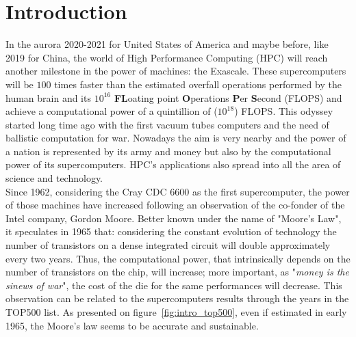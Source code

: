 \chapter*{Introduction}

In the aurora 2020-2021 for United States of America and maybe before, like 2019 for China, the world of High Performance Computing (HPC) will reach another milestone in the power of machines: the Exascale. 
These supercomputers will be $100$ times faster than the estimated overfall operations performed by the human brain and its $10^{16}$ \textbf{FL}oating point \textbf{O}perations \textbf{P}er \textbf{S}econd (FLOPS) and achieve a computational power of a quintillion of ($10^{18}$) FLOPS.
This odyssey started long time ago with the first vacuum tubes computers and the need of ballistic computation for war. 
Nowadays the aim is very nearby and the power of a nation is represented by its army and money but also by the computational power of its supercomputers.
HPC's applications also spread into all the area of science and technology.\\

Since 1962, considering the Cray CDC 6600 as the first supercomputer, the power of those machines have increased following an observation of the co-fonder of the Intel company, Gordon Moore. 
Better known under the name of "Moore's Law", it speculates in 1965 that: considering the constant evolution of technology the number of transistors on a dense integrated circuit will double approximately every two years. 
Thus, the computational power, that intrinsically depends on the number of transistors on the chip, will increase; more important, as "\textit{money is the sinews of war}", the cost of the die for the same performances will decrease.  
This observation can be related to the supercomputers results through the years in the TOP500 list. 
As presented on figure~\ref{fig:intro_top500}, even if estimated in early 1965, the Moore's law seems to be accurate and sustainable. 

